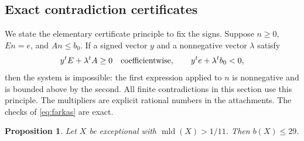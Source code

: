 \documentclass[12pt,a4paper]{article}
\numberwithin{equation}{section}
\newtheorem{proposition}[theorem]{Proposition}
\theoremstyle{definition}
\newcommand{\mld}{\operatorname{mld}}
\begin{document}
\subsection{Exact contradiction certificates}

We state the elementary certificate principle to fix the signs.
Suppose \(n\geq0\), \(En=e\), and \(An\leq b_0\).
If a signed vector \(y\) and a nonnegative vector \(\lambda\) satisfy
\begin{equation}\label{eq:farkas}
       y^tE+\lambda^tA\geq0
       \quad\hbox{coefficientwise},\qquad
       y^te+\lambda^tb_0<0,
\end{equation}
then the system is impossible: the first expression applied to
\(n\) is nonnegative and is bounded above by the second.
All finite contradictions in this section use this principle.
The multipliers are explicit rational numbers in the attachments.
The checks of \eqref{eq:farkas} are exact.

\begin{proposition}\label{prop:29}
Let \(X\) be exceptional with \(\mld(X)>1/11\). Then \(b(X)\leq29\).
\end{proposition}
\end{document}
